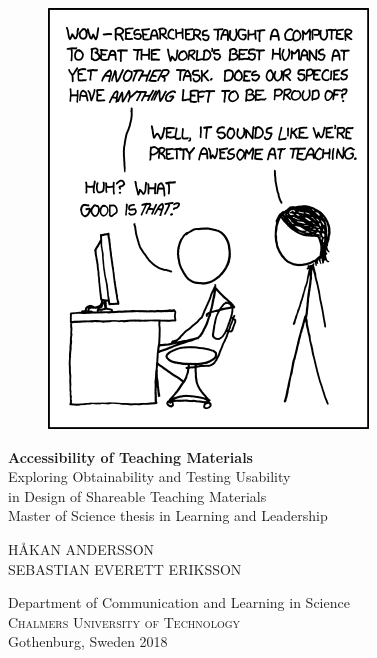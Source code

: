 
\begin{titlepage}
			
\addtolength{\voffset}{2cm}

\begin{figure}[H]
\centering
\vspace{2cm}	%
\includegraphics[width=0.4\linewidth]{figure/progeny.png}
\end{figure}

\mbox{}
\vfill
\renewcommand{\familydefault}{\sfdefault} \normalfont %
\textbf{{\Huge Accessibility of Teaching Materials 	}} 	\\[0.5cm]
{\Large Exploring Obtainability and Testing Usability \\[0.1cm] in Design of Shareable Teaching Materials}\\[0.5cm]
Master of Science thesis in Learning and Leadership \setlength{\parskip}{1cm}

{\Large HÅKAN ANDERSSON \\[0.2cm] SEBASTIAN EVERETT ERIKSSON} \setlength{\parskip}{2.9cm}

Department of Communication and Learning in Science \\
\textsc{Chalmers University of Technology} \\
Gothenburg, Sweden 2018

\renewcommand{\familydefault}{\rmdefault} \normalfont %
\end{titlepage}


